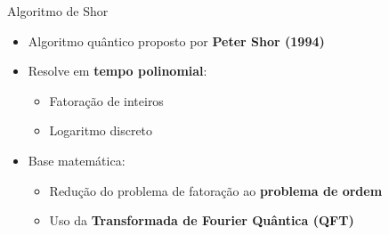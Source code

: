 \documentclass[aspectratio=169]{beamer}
\begin{document}
	
		\begin{frame}{Algoritmo de Shor}
		
		\begin{itemize}
			
			\item Algoritmo quântico proposto por \textbf{Peter Shor (1994)}
			
			\item Resolve em \textbf{tempo polinomial}:
			
			\begin{itemize}
				
				\item Fatoração de inteiros
				
				\item Logaritmo discreto
				
			\end{itemize}
			
			\item Base matemática:
			
			\begin{itemize}
				
				\item Redução do problema de fatoração ao \textbf{problema de ordem}
				
				\item Uso da \textbf{Transformada de Fourier Quântica (QFT)}
				
			\end{itemize}
			
		\end{itemize}
		
	\end{frame}
	
	
	
\end{document}
